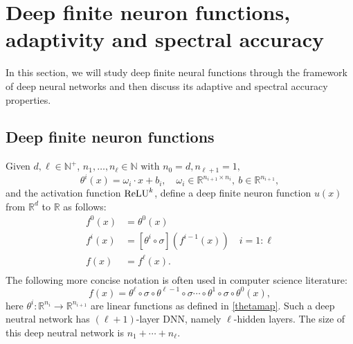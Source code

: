 
\section{Deep finite neuron functions, adaptivity and spectral
  accuracy}  
\label{sec:deep-fnm} 
In this section, we will study deep finite neural functions through
the framework of  deep neural networks and then discuss its adaptive
and spectral accuracy properties. 

\subsection{Deep finite neuron functions}
Given $d, \ell\in\mathbb{N}^+$, 
$
n_1,\dots,n_{\ell}\in\mathbb{N} \mbox{ with }n_0=d, n_{\ell+1}=1, 
$
\begin{equation}\label{thetamap}
\theta^i(x)=\omega_i\cdot x + b_i,\quad \omega_i\in \mathbb{R}^{n_{i+1}\times n_i},\ b\in \mathbb{R}^{n_{i+1}},
\end{equation}
and the activation function ${\rm ReLU}^k$, define
a  deep finite neuron function $u(x)$ from $\mathbb{R}^d$ to $\mathbb{R}$  as follows:
\begin{align*}
f^0(x)   &=\theta^0(x) \\ 
f^{i}(x) &= [  \theta^{i} \circ \sigma ](f^{i-1}(x)) \quad i = 1:\ell \\
f(x) &= f^\ell(x). \\
\end{align*}
The following more concise notation is often used in computer science literature:
\begin{equation}
\label{compress-dnn}
f(x) = \theta^{\ell}\circ \sigma \circ \theta^{\ell-1} \circ \sigma \cdots \circ \theta^1 \circ \sigma \circ \theta^0(x),
\end{equation}
here $\theta^i: \mathbb{R}^{n_{i}}\to\mathbb{R}^{n_{i+1}}$ are linear
functions as defined in \eqref{thetamap}.  Such a deep neutral network
has $(\ell+1)$-layer DNN, namely $\ell$-hidden layers. The size of
this deep neutral network is $n_1+\cdots+n_{\ell}$.

